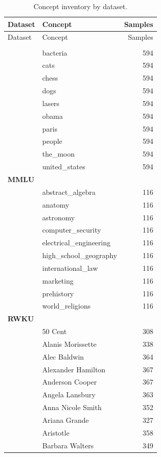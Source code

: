 \documentclass{article}
\begin{document}
{\small
\begin{longtable}{p{}p{}r}
\caption{Concept inventory by dataset.}
\label{tab:appendix-concepts}\\
\hline
Dataset & Concept & Samples \\
\hline
\endfirsthead
\hline
Dataset & Concept & Samples \\
\hline
\endhead
\hline
\endfoot
\multicolumn{3}{l}{\textbf{In-house}} \\
 & bacteria & 594 \\
 & cats & 594 \\
 & chess & 594 \\
 & dogs & 594 \\
 & lasers & 594 \\
 & obama & 594 \\
 & paris & 594 \\
 & people & 594 \\
 & the\_moon & 594 \\
 & united\_states & 594 \\
\multicolumn{3}{l}{\textbf{MMLU}} \\
 & abstract\_algebra & 116 \\
 & anatomy & 116 \\
 & astronomy & 116 \\
 & computer\_security & 116 \\
 & electrical\_engineering & 116 \\
 & high\_school\_geography & 116 \\
 & international\_law & 116 \\
 & marketing & 116 \\
 & prehistory & 116 \\
 & world\_religions & 116 \\
\multicolumn{3}{l}{\textbf{RWKU}} \\
 & 50 Cent & 308 \\
 & Alanis Morissette & 338 \\
 & Alec Baldwin & 364 \\
 & Alexander Hamilton & 367 \\
 & Anderson Cooper & 367 \\
 & Angela Lansbury & 363 \\
 & Anna Nicole Smith & 352 \\
 & Ariana Grande & 327 \\
 & Aristotle & 358 \\
 & Barbara Walters & 349 \\

\end{longtable}}
\end{document}
